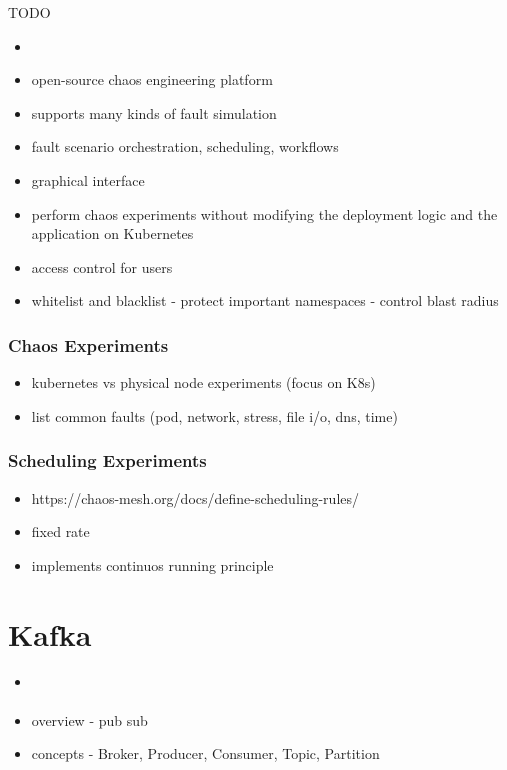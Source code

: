 TODO

\begin{itemize}
	\item \cite{ChaosMesh}
	\item open-source chaos engineering platform
	\item supports many kinds of fault simulation
	\item fault scenario orchestration, scheduling, workflows
	\item graphical interface
	\item perform chaos experiments without modifying the deployment logic and the application on Kubernetes
	\item access control for users
	\item whitelist and blacklist - protect important namespaces - control blast radius
	
\end{itemize}

\subsubsection{Chaos Experiments}

\begin{itemize}
	\item kubernetes vs physical node experiments (focus on K8s)
	\item list common faults (pod, network, stress, file i/o, dns, time)
\end{itemize}

\subsubsection{Scheduling Experiments}

\begin{itemize}
	\item https://chaos-mesh.org/docs/define-scheduling-rules/
	\item fixed rate
	\item implements continuos running principle
\end{itemize}

\section{Kafka} \label{background-kafka}

\begin{itemize}
	\item \cite{KafkaDefinitive}
	\item overview - pub sub \cite{PubSubAmazon}
	\item concepts - Broker, Producer, Consumer, Topic, Partition
\end{itemize}

